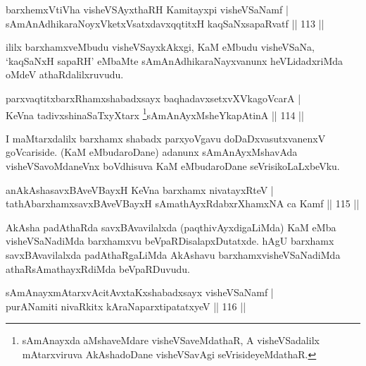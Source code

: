 \begin{shl}
barxhemxVtiVha visheVSAyxthaRH Kamitayxpi visheVSaNamf  | \\
sAmAnAdhikaraNoyxVketxVsatxdavxqqtitxH kaqSaNxsapaRvatf  \hfill||  113 ||  
\end{shl}

\begin{artha}
ililx barxhamxveMbudu visheVSayxkAkxgi, KaM eMbudu visheVSaNa, `kaqSaNxH sapaRH' eMbaMte sAmAnAdhikaraNayxvanunx heVLidadxriMda oMdeV athaRdalilxruvudu.
\end{artha}


\begin{shl}
parxvaqtitxbarxRhamxshabadxsayx baqhadavxsetxvXVkagoVcarA  | \\
KeVna tadivxshinaSaTxyXtarx \footnote{sAmAnayxda aMshaveMdare visheVSaveMdathaR, A visheVSadalilx mAtarxviruva AkAshadoDane visheVSavAgi seVrisideyeMdathaR.}sAmAnAyxMsheYkapAtinA \hfill||  114 ||  
\end{shl}

\begin{artha}
I maMtarxdalilx barxhamx shabadx parxyoVgavu doDaDxvasutxvanenxV goVcariside. (KaM eMbudaroDane) adanunx sAmAnAyxMshavAda visheVSavoMdaneVnx boVdhisuva KaM eMbudaroDane seVrisikoLaLxbeVku.
\end{artha}


\begin{shl}
anAkAshasavxBAveVBayxH KeVna barxhamx nivatayxRteV  | \\
tathA\s barxhamxsavxBAveVBayxH sAmathAyxRdabxrXhamxNA ca Kamf \hfill||  115 ||  
\end{shl}

\begin{artha}
AkAsha padAthaRda savxBAvavilalxda (paqthivAyxdigaLiMda) KaM eMba visheVSaNadiMda barxhamxvu beVpaRDisalapxDutatxde. hAgU barxhamx savxBAvavilalxda padAthaRgaLiMda AkAshavu barxhamxvisheVSaNadiMda athaRsAmathayxRdiMda beVpaRDuvudu.
\end{artha}

\begin{shl}
sAmAnayxmAtarxvAcitAvxtaKxshabadxsayx visheVSaNamf  | \\
purANamiti nivaRkitx kAraNaparxtipatatxyeV \hfill||  116 ||  
\end{shl}

